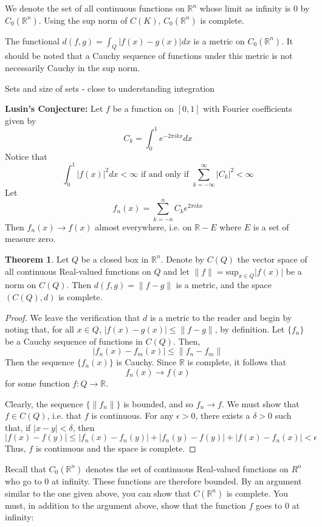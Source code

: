 \documentclass[12pt,leqno]{article}
\numberwithin{equation}{section}
\theoremstyle{definition}
\newtheorem*{Thm}{Theorem}
\begin{document}
We denote the set of all continuous functions on $\mathbb{R}^n$ whose limit as infinity is $0$ by $C_0(\mathbb{R}^n)$. Using the sup norm of $C(K)$, $C_0(\mathbb{R}^n)$ is complete.

The functional $d(f,g)=\int_Q|f(x)-g(x)|dx$ is a metric on $C_0(\mathbb{R}^n)$. It should be noted that a Cauchy sequence of functions under this metric is not necessarily Cauchy in the sup norm.

Sets and size of sets - close to understanding integration

\textbf{Lusin's Conjecture:} Let $f$ be a function on $[0,1]$ with Fourier coefficients given by \[C_k=\int_0^1e^{-2\pi ikx}dx\] Notice that \[\int_0^1|f(x)|^2dx<\infty\text{ if and only if }\sum_{k=-\infty}^{\infty}|C_k|^2<\infty\] Let \[f_n(x)=\sum_{k=-n}^nC_ke^{2\pi ikx}\] Then $f_n(x)\to f(x)$ almost everywhere, i.e. on $\mathbb{R}-E$ where $E$ is a set of measure zero.

\begin{Thm}
 Let $Q$ be a closed box in $\mathbb{R}^n$. Denote by $C(Q)$ the vector space of all continuous Real-valued functions on $Q$ and let $\|f\|=\text{sup}_{x\in Q}|f(x)|$ be a norm on $C(Q)$. Then $d(f,g)=\|f-g\|$ is a metric, and the space $(C(Q),d)$ is complete.
\end{Thm}

\begin{proof}
 We leave the verification that $d$ is a metric to the reader and begin by noting that, for all $x\in Q$, $|f(x)-g(x)|\leq\|f-g\|$, by definition. Let $\{f_n\}$ be a Cauchy sequence of functions in $C(Q)$. Then, \[|f_n(x)-f_m(x)|\leq\|f_n-f_m\|\] Then the sequence $\{f_n(x)\}$ is Cauchy. Since $\mathbb{R}$ is complete, it follows that \[f_n(x)\to f(x)\] for some function $f:Q\to\mathbb{R}$. 

Clearly, the sequence $\{\|f_n\|\}$ is bounded, and so $f_n\to f$. We must show that $f\in C(Q)$, i.e. that $f$ is continuous. For any $\epsilon>0$, there exists a $\delta>0$ such that, if $|x-y|<\delta$, then \[|f(x)-f(y)|\leq|f_n(x)-f_n(y)|+|f_n(y)-f(y)|+|f(x)-f_n(x)|<\epsilon\] Thus, $f$ is continuous and the space is complete. 
\end{proof}

Recall that $C_0(\mathbb{R}^n)$ denotes the set of continuous Real-valued functions on $R^n$ who go to $0$ at infinity. These functions are therefore bounded. By an argument similar to the one given above, you can show that $C(\mathbb{R}^n)$ is complete. You must, in addition to the argument above, show that the function $f$ goes to $0$ at infinity:
\end{document}
